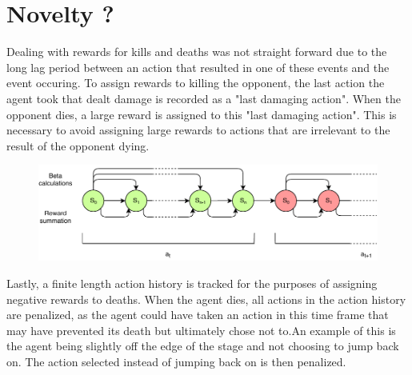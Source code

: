 \section{Novelty ? }


Dealing with rewards for kills and deaths was not straight forward due to the long lag period between an action that resulted in one of these events and the event occuring. To assign rewards to killing the opponent, the last action the agent took that dealt damage is recorded as a "last damaging action". When the opponent dies, a large reward is assigned to this "last damaging action". This is necessary to avoid assigning large rewards to actions that are irrelevant to the result of the opponent dying.
\begin{figure}
	\includegraphics{stateevolution.pdf}
\end{figure}

Lastly, a finite length action history is tracked for the purposes of assigning negative rewards to deaths. When the agent dies, all actions in the action history are penalized, as the agent could have taken an action in this time frame that may have prevented its death but ultimately chose not to.An example of this is the agent being slightly off the edge of the stage and not choosing to jump back on. The action selected instead of jumping back on is then penalized.

